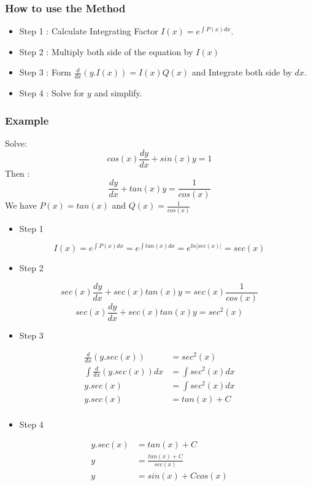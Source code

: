 \documentclass[12pt,a4paper]{article}
\begin{document}
	\subsubsection{How to use the Method}
	\begin{itemize}
		\item Step 1 : Calculate Integrating Factor $ I(x) = e^{\int P(x)dx}$.
		\item Step 2 : Multiply both side of the equation by $ I(x) $
		\item Step 3 : Form $ \frac{d}{dx} (y.I(x)) = I(x)Q(x)$ and Integrate both side by $ dx $.
		\item Step 4 : Solve for $ y $ and simplify.
	\end{itemize}
	\subsubsection{Example}
	Solve:
	\[
	cos(x)\frac{dy}{dx} + sin(x)y= 1
	\]
	Then :
	\[
	\frac{dy}{dx} + tan(x)y= \frac{1}{cos(x)}
	\]
	We have $ P(x) = tan(x)$ and $ Q(x) = \frac{1}{cos(x)} $
	\begin{itemize}
		\item Step 1
	\end{itemize}
	\[
	I(x) = e^{\int P(x)dx} = e^{\int tan(x)dx} = e^{ln|sec(x)|} = sec(x)
	\]
	\begin{itemize}
		\item Step 2
	\end{itemize}
	\[
	sec(x)\frac{dy}{dx} + sec(x)tan(x)y= sec(x)\frac{1}{cos(x)}
	\]
	\[
	sec(x)\frac{dy}{dx} + sec(x)tan(x)y= sec^2(x)
	\]
	\begin{itemize}
		\item Step 3
	\end{itemize}
	\[
	\begin{split}
		\frac{d}{dx}(y.sec(x)) &= sec^2(x) \\
		\int \frac{d}{dx}(y.sec(x))dx &= \int sec^2(x) dx\\
		y.sec(x) &= \int sec^2(x) dx\\
		y.sec(x) &= tan(x) + C\\
	\end{split}
	\]
	\begin{itemize}
		\item Step 4
	\end{itemize}
	\[
	\begin{split}
		y.sec(x) &= tan(x) + C\\
		y &= \frac{tan(x) + C}{sec(x)} \\
		y &= sin(x) + Ccos(x)
	\end{split}
	\]
\end{document}
